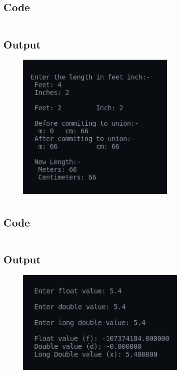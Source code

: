 \documentclass[12pt]{article}
\begin{document}
\subsection{Code}
\inputminted{c}{q9b.c}
\subsection{Output}
\begin{figure}[h]
    \centering
    \includegraphics[width=0.7\textwidth]{9b.png}
\end{figure}
\newpage
\section{}
\subsection{Code}
\inputminted{c}{q10.c}
\subsection{Output}
\begin{figure}[h]
    \centering
    \includegraphics[width=0.75\textwidth]{10.png}
\end{figure}
\end{document}
